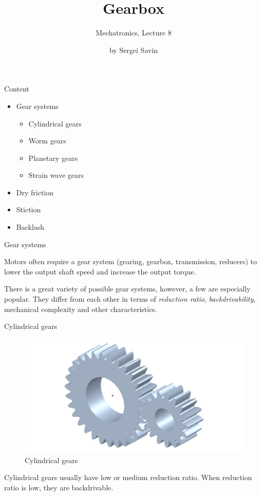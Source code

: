 \documentclass{beamer}
\title{Gearbox}
\subtitle{Mechatronics, Lecture 8}
\author{by Sergei Savin}
\date{\mydate}
\begin{document}
\maketitle



\begin{frame}{Content}
\begin{itemize}
\item Gear systems
\begin{itemize}
	\item Cylindrical gears
	\item Worm gears
	\item Planetary gears
	\item Strain wave gears
\end{itemize}
\item Dry friction
\item Stiction
\item Backlash
\end{itemize}
\end{frame}




\begin{frame}{Gear systems}
	\begin{flushleft}
		
		Motors often require a gear system (gearing, gearbox, transmission, reducers) to lower the output shaft speed and increase the output torque.
		
		\bigskip
		
		
		There is a great variety of possible gear systems, however, a few are especially popular. They differ from each other in terms of \emph{reduction ratio}, \emph{backdrivability}, mechanical complexity and other characteristics.
		
	\end{flushleft}
\end{frame}



\begin{frame}{Cylindrical gears}
	\begin{flushleft}
		
		\begin{figure}
			\centering
			\includegraphics[width=0.7\linewidth]{cylindrical}
			\caption{Cylindrical gears}
			\label{fig:cylindrical}
		\end{figure}
		
		Cylindrical gears usually have low or medium reduction ratio. When reduction ratio is low, they are backdrivable. 
		
	\end{flushleft}
\end{frame}
\end{document}
